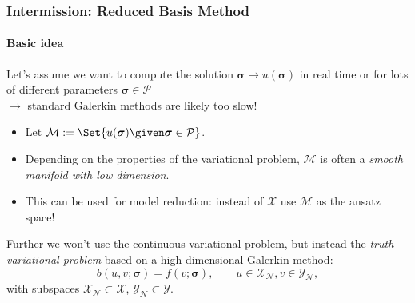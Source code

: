 \begin{frame}[t]
    \frametitle{Intermission: Reduced Basis Method}
    \framesubtitle{Basic idea}

    \onslide
    Let's assume we want to compute the solution $\bm \sigma \mapsto u(\bm \sigma)$ in real time or for lots of different parameters $\bm \sigma \in \mathcal P$\\
    $\rightarrow$ standard Galerkin methods are likely too slow!

    \begin{itemize}
        \item {}Let $\mathcal M := \Set{ u(\bm \sigma) \given \bm \sigma \in \mathcal P }$.
        \item Depending on the properties of the variational problem, $\mathcal M$ is often a \emph{smooth manifold with low dimension}.
        \item This can be used for model reduction: instead of $\mathcal X$ use $\mathcal M$ as the ansatz space!
    \end{itemize}

    \vfill

    Further we won't use the continuous variational problem, but instead the \emph{truth variational problem} based on a high dimensional Galerkin method:
    \begin{equation}
        b(u, v; \bm \sigma) = f(v; \bm \sigma), \qquad u \in \mathcal X_{\mathcal N}, v \in \mathcal Y_{\mathcal N},
    \end{equation}
    with subspaces $\mathcal X_{\mathcal N} \subset \mathcal X$, $\mathcal Y_{\mathcal N} \subset \mathcal Y$.
\end{frame}

